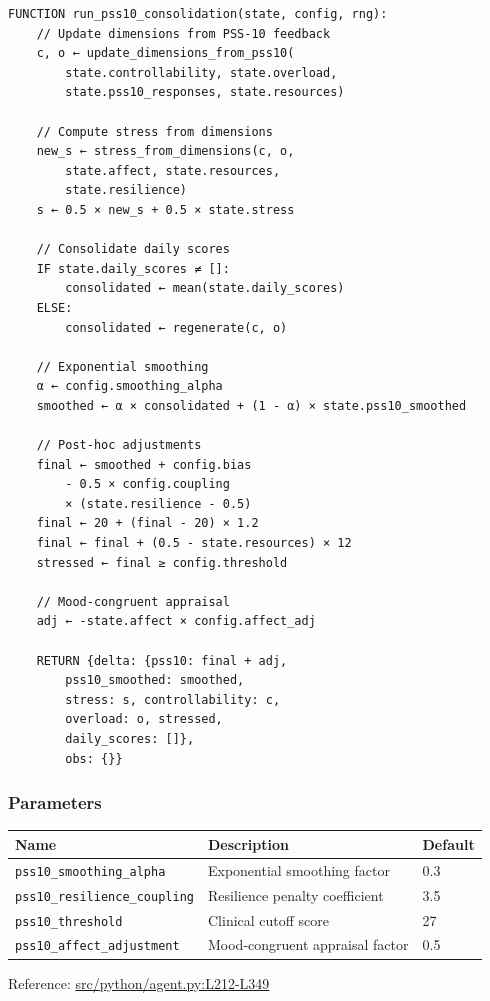 \documentclass[
  letterpaper,
  DIV=11,
  numbers=noendperiod]{scrartcl}
\newcommand{\trow}[3]{%
  \texttt{\allowbreak #1} & #2 & #3 \\
}
\begin{document}
\begin{verbatim}
FUNCTION run_pss10_consolidation(state, config, rng):
    // Update dimensions from PSS-10 feedback
    c, o ← update_dimensions_from_pss10(
        state.controllability, state.overload,
        state.pss10_responses, state.resources)

    // Compute stress from dimensions
    new_s ← stress_from_dimensions(c, o,
        state.affect, state.resources,
        state.resilience)
    s ← 0.5 × new_s + 0.5 × state.stress

    // Consolidate daily scores
    IF state.daily_scores ≠ []:
        consolidated ← mean(state.daily_scores)
    ELSE:
        consolidated ← regenerate(c, o)

    // Exponential smoothing
    α ← config.smoothing_alpha
    smoothed ← α × consolidated + (1 - α) × state.pss10_smoothed

    // Post-hoc adjustments
    final ← smoothed + config.bias
        - 0.5 × config.coupling
        × (state.resilience - 0.5)
    final ← 20 + (final - 20) × 1.2
    final ← final + (0.5 - state.resources) × 12
    stressed ← final ≥ config.threshold

    // Mood-congruent appraisal
    adj ← -state.affect × config.affect_adj

    RETURN {delta: {pss10: final + adj,
        pss10_smoothed: smoothed,
        stress: s, controllability: c,
        overload: o, stressed,
        daily_scores: []},
        obs: {}}
\end{verbatim}

\subsubsection{Parameters}\label{parameters-7}

\begin{tabularx}{\textwidth}{p{4.5cm}Xp{2cm}}
\toprule
\textbf{Name} & \textbf{Description} & \textbf{Default} \\
\midrule
\trow{pss10\_smoothing\_alpha}{Exponential smoothing factor}{0.3}
\trow{pss10\_resilience\_coupling}{Resilience penalty coefficient}{3.5}
\trow{pss10\_threshold}{Clinical cutoff score}{27}
\trow{pss10\_affect\_adjustment}{Mood-congruent appraisal factor}{0.5}
\bottomrule
\end{tabularx}

Reference:
\href{https://github.com/namakala/abm-simulation/blob/84ff9b37fb0c569bef9f122e789d9c23a89348ec/src/python/agent.py\#L212-L349}{src/python/agent.py:L212-L349}
\end{document}
